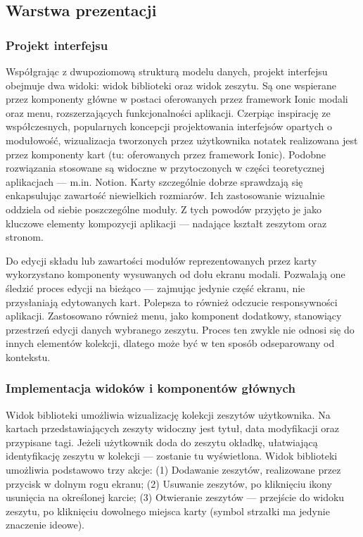 \subsection{Warstwa prezentacji}
\subsubsection{Projekt interfejsu}
Współgrając z dwupoziomową strukturą modelu danych, projekt interfejsu obejmuje dwa widoki: widok biblioteki oraz widok zeszytu.
Są one wspierane przez komponenty główne w postaci oferowanych przez framework Ionic modali oraz menu,
rozszerzających funkcjonalności aplikacji. Czerpiąc inspirację ze współczesnych, popularnych koncepcji projektowania interfejsów
opartych o modułowość, wizualizacja tworzonych przez użytkownika notatek realizowana jest przez komponenty
kart (tu: oferowanych przez framework Ionic). Podobne rozwiązania stosowane są widoczne w przytoczonych w części teoretycznej
aplikacjach — m.in. Notion. Karty szczególnie dobrze sprawdzają się enkapsulując zawartość niewielkich rozmiarów.
Ich zastosowanie wizualnie oddziela od siebie poszczególne moduły. Z tych powodów przyjęto je jako kluczowe elementy
kompozycji aplikacji — nadające kształt zeszytom oraz stronom.

Do edycji składu lub zawartości modułów reprezentowanych przez karty wykorzystano komponenty wysuwanych od dołu ekranu modali.
Pozwalają one śledzić proces edycji na bieżąco — zajmując jedynie część ekranu, nie przysłaniają edytowanych kart.
Polepsza to również odczucie responsywności aplikacji.
Zastosowano również menu, jako komponent dodatkowy, stanowiący przestrzeń edycji danych wybranego zeszytu. Proces ten zwykle
nie odnosi się do innych elementów kolekcji, dlatego może być w ten sposób odseparowany od kontekstu.

\subsubsection{Implementacja widoków i komponentów głównych}
Widok biblioteki umożliwia wizualizację kolekcji zeszytów użytkownika. Na kartach przedstawiających zeszyty widoczny jest tytuł,
data modyfikacji oraz przypisane tagi. Jeżeli użytkownik doda do zeszytu okładkę, ułatwiającą identyfikację zeszytu w kolekcji — zostanie
tu wyświetlona. Widok biblioteki umożliwia podstawowo trzy akcje: (1) Dodawanie zeszytów, realizowane przez przycisk w dolnym rogu ekranu;
(2) Usuwanie zeszytów, po kliknięciu ikony usunięcia na określonej karcie;
(3) Otwieranie zeszytów — przejście do widoku zeszytu, po kliknięciu dowolnego miejsca karty (symbol strzałki
ma jedynie znaczenie ideowe).

